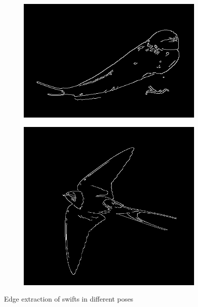 \documentclass[conference]{IEEEtran}
\begin{document}
			\begin{figure}[!t]
				\centering
				\begin{subfigure}[!t]{0.48\linewidth}
					\centerline{\includegraphics[width=0.9\linewidth]{imgs/swallow_edges.jpg}}
				\end{subfigure}
				\begin{subfigure}[!t]{0.48\linewidth}
					\centerline{\includegraphics[width=0.9\linewidth]{imgs/swallow_2_edges.jpg}}
				\end{subfigure}
				\caption{Edge extraction of swifts in different poses}
				\label{fig:9}
			\end{figure}
			
\end{document}
